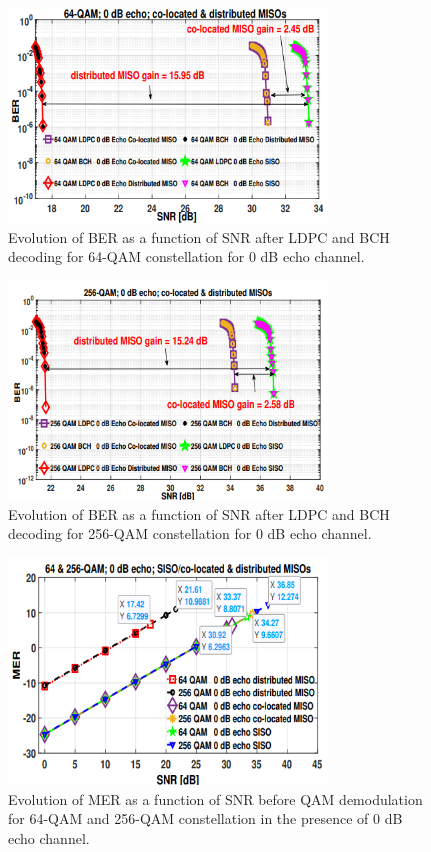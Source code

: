 \documentclass[10pt, conference]{IEEEtran}
\begin{document}
\begin{figure}[!htbp]
\centering
\includegraphics[width=8.5cm]{img5.png}
    \caption{Evolution of BER as a function of SNR after LDPC and BCH decoding for 64-QAM constellation for 0 dB echo channel.}
\end{figure}

\begin{figure}[!htbp]
\centering
\includegraphics[width=8.5cm]{img6.png}
    \caption{Evolution of BER as a function of SNR after LDPC and BCH decoding for 256-QAM constellation for 0 dB echo channel.}
\end{figure}


\begin{figure}[!htbp]
\centering
\includegraphics[width=8.5cm]{img7.png}
    \caption{Evolution of MER as a function of SNR before QAM demodulation for 64-QAM and 256-QAM constellation in the presence of 0 dB echo channel.}
\end{figure}
\end{document}
